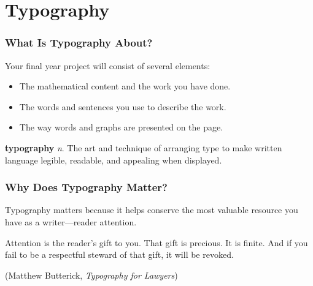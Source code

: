 \section{Typography}


\begin{frame}
\frametitle{What Is Typography About?}
Your final year project will consist of several elements:
\begin{itemize}
\item<2->
The mathematical content and the work you have done.
\item<3->
The words and sentences you use to describe the work.
\item<4-|alert@5-|trans:alert@1|handout:alert@1>
The way words and graphs are presented on the page.
\end{itemize}

\begin{center}
\begin{minipage}{0.8\linewidth}
\begin{block}{}
\textbf{typography} \emph{n}. The art and technique of arranging type to make written language legible, readable, and appealing when displayed.
\hfill{}
\end{block}
\end{minipage}
\end{center}
\end{frame}

\begin{frame}
\frametitle{Why Does Typography Matter?}
\begin{cvarblock}[0.9\linewidth]{}
Typography matters because it helps conserve the most valuable resource you have as a writer---reader attention.
\medskip

Attention is the reader’s gift to you. That gift is precious. It is finite. And if you fail to be a respectful steward of that gift, it will be revoked.

\hfill (Matthew Butterick, \emph{Typography for Lawyers})
\end{cvarblock}
\end{frame}


